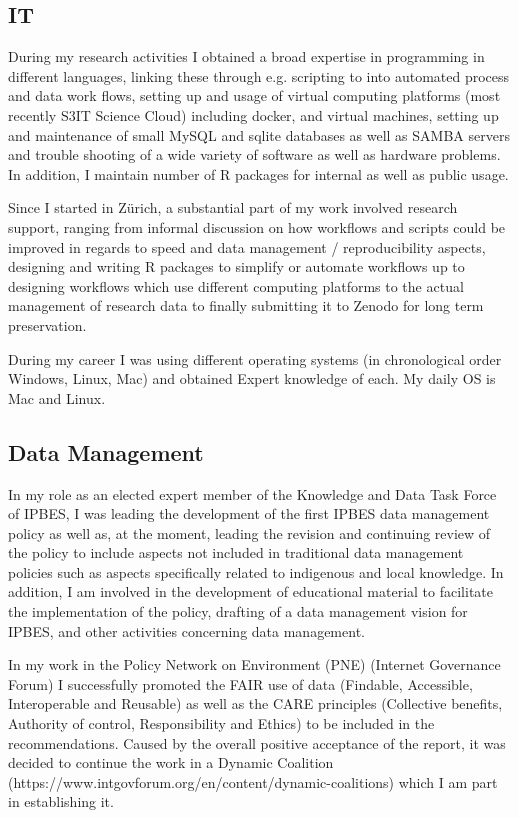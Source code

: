 \documentclass[a4paper]{article}
\begin{document}
\subsection{IT}

During my research activities I obtained a broad expertise in programming in different languages, linking these through e.g. scripting to into automated process and data work flows, setting up and usage of virtual computing platforms (most recently S3IT Science Cloud) including docker, and virtual machines, setting up and maintenance of small MySQL and sqlite databases as well as SAMBA servers and trouble shooting of a wide variety of software as well as hardware problems. In addition, I maintain number of R packages for internal as well as public usage.  

Since I started in Zürich, a substantial part of my work involved research support, ranging from informal discussion on how workflows and scripts could be improved in regards to speed and data management / reproducibility aspects, designing and writing R packages to simplify or automate workflows up to designing workflows which use different computing platforms to the actual management of research data to finally submitting it to Zenodo for long term preservation.

During my career I was using different operating systems (in chronological order Windows, Linux, Mac) and obtained Expert knowledge of each. My daily OS is Mac and Linux. 

\subsection{Data Management}


In my role as an elected expert member of the Knowledge and Data Task Force of IPBES, I was leading the development of the first IPBES data management policy as well as, at the moment, leading the revision and continuing review of the policy to include aspects not included in traditional data management policies such as aspects specifically related to indigenous and local knowledge. 
In addition, I am involved in the development of educational material to facilitate the implementation of the policy, drafting of a data management vision for IPBES, and other activities concerning data management.

In my work in the Policy Network on Environment (PNE)  (Internet Governance Forum) I successfully promoted the FAIR use of data (Findable, Accessible, Interoperable and Reusable) as well as the CARE principles (Collective benefits, Authority of control, Responsibility and Ethics) to be included in the recommendations. Caused by the overall positive acceptance of the report, it was decided to continue the work in a Dynamic Coalition (https://www.intgovforum.org/en/content/dynamic-coalitions) which I am part in establishing it.
\end{document}
